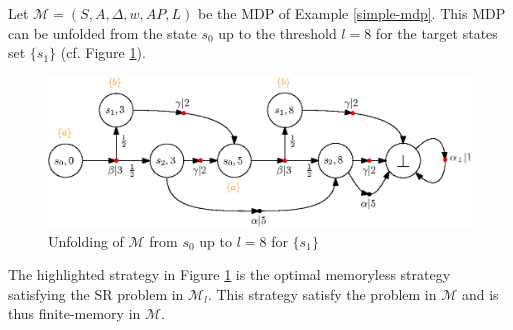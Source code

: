 \begin{example}
  Let $\mathcal{M} = (S, A, \Delta, w, AP, L)$ be the MDP of Example \ref{simple-mdp}.
  This MDP can be unfolded from the state $s_0$ up to the threshold $l = 8$ for the target states set $\{s_1\}$ (cf. Figure \ref{unfolding}).
  \begin{figure}[h!]
    \centering
    \includegraphics[width=0.8\linewidth]{resources/unfolding}
    \caption{Unfolding of $\mathcal{M}$ from $s_0$ up to $l=8$ for $\{s_1\}$}\label{unfolding}
  \end{figure}
  The highlighted strategy in Figure \ref{unfolding} is the optimal memoryless strategy satisfying the SR problem in $\mathcal{M}_l$. This strategy satisfy the \SSPP{} problem in $\mathcal{M}$ and is thus finite-memory in $\mathcal{M}$.
\end{example}
